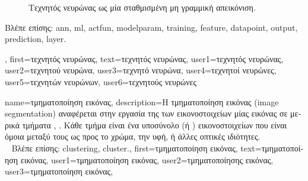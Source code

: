 {{\begin{figure}[H]
              {
              \caption{\foreignlanguage{greek}{Τεχνητός νευρώνας ως μία σταθμισμένη μη γραμμική απεικόνιση}.} }
              \end{figure}
              \foreignlanguage{greek}{Βλέπε επίσης:} \gls{ann}, \gls{ml}, \gls{actfun}, \gls{modelparam}, \gls{training}, \gls{feature}, \gls{datapoint}, \gls{output}, 
              \gls{prediction}, \gls{layer}. },
	first={\foreignlanguage{greek}{τεχνητός νευρώνας}},
	text={\foreignlanguage{greek}{τεχνητός νευρώνας}},
	user1={\foreignlanguage{greek}{τεχνητός νευρώνας}}, %
	user2={\foreignlanguage{greek}{τεχνητού νευρώνα}}, %
	user3={\foreignlanguage{greek}{τεχνητό νευρώνα}}, %
	user4={\foreignlanguage{greek}{τεχνητοί νευρώνες}}, %
	user5={\foreignlanguage{greek}{τεχνητών νευρώνων}}, %
	user6={\foreignlanguage{greek}{τεχνητούς νευρώνες}} %
}

{name={\foreignlanguage{greek}{τμηματοποίηση εικόνας}}, 
	description={\foreignlanguage{greek}{Η τμηματοποίηση εικόνας} (image segmentation) 
		\foreignlanguage{greek}{αναφέρεται στην εργασία της}  \foreignlanguage{greek}{των εικονοστοιχείων μίας
		εικόνας σε μερικά τμήματα} \cite{JungLocalGraphClustering}, \cite{Wren1997}. \foreignlanguage{greek}{Κάθε τμήμα είναι ένα υποσύνολο
		(ή} ) \foreignlanguage{greek}{εικονοστοιχείων που είναι όμοια μεταξύ τους ως προς το χρώμα, την υφή, ή άλλες 
		οπτικές ιδιότητες.} 
		\\ 
 		\foreignlanguage{greek}{Βλέπε επίσης:} \gls{clustering}, \gls{cluster}.}, 
 	first={\foreignlanguage{greek}{τμηματοποίηση εικόνας}}, 
 	text={\foreignlanguage{greek}{τμηματοποίηση εικόνας}},
	user1={\foreignlanguage{greek}{τμηματοποίηση εικόνας}}, %
	user2={\foreignlanguage{greek}{τμηματοποίησης εικόνας}}, %
	user3={\foreignlanguage{greek}{τμηματοποίηση εικόνας}}, %
}

